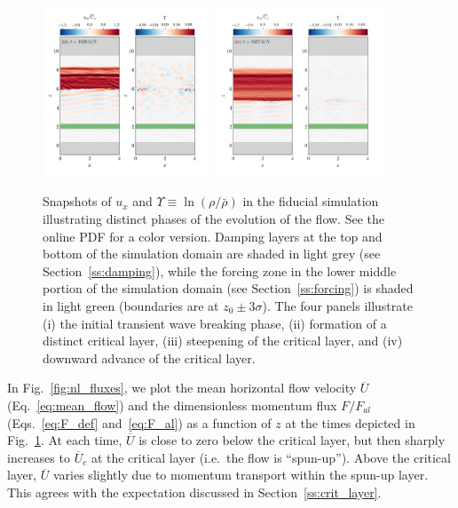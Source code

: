 \documentclass[
        fleqn,
        usenatbib,
    ]{mnras}
\newcommand*{\p}[1]{\left(#1\right)}
\begin{document}
\begin{figure}
    \includegraphics[width=0.45\textwidth]{plots/yubo_000134_labeled.png}\hfil
    \includegraphics[width=0.45\textwidth]{plots/yubo_000451_labeled.png}
    \caption{Snapshots of $u_x$ and $\Upsilon \equiv \ln \p{\rho / \bar{\rho}}$
    in the fiducial simulation illustrating distinct phases of the evolution of
    the flow. \textcolor{Corr}{See the online PDF for a color version.} Damping
    layers \textcolor{Corr}{at the top and bottom of the simulation domain} are
    shaded in light grey (see Section~\ref{ss:damping}), while the forcing zone
    \textcolor{Corr}{in the lower middle portion of the simulation domain} (see
    Section~\ref{ss:forcing}) is shaded in light green (boundaries are at $z_0
    \pm 3\sigma$). The four panels illustrate (i) the initial transient wave
    breaking phase, (ii) formation of a distinct critical layer, (iii)
    steepening of the critical layer, and (iv) downward advance of the critical
    layer.}\label{fig:snapshots}
\end{figure}

In Fig.~\ref{fig:nl_fluxes}, we plot the mean horizontal flow velocity
$\overline{U}$ (Eq.~\eqref{eq:mean_flow}) and the dimensionless momentum flux $F
/ F_{al}$ (Eqs.~\eqref{eq:F_def} and~\eqref{eq:F_al}) as a function of $z$ at
the times depicted in Fig.~\ref{fig:snapshots}. At each time, $\overline{U}$ is
close to zero below the critical layer, but then sharply increases to
$\overline{U}_c$ at the critical layer (i.e.\ the flow is ``spun-up''). Above
the critical layer, $\overline{U}$ varies slightly due to momentum transport
within the spun-up layer. This agrees with the expectation discussed in
Section~\ref{ss:crit_layer}.
\end{document}

